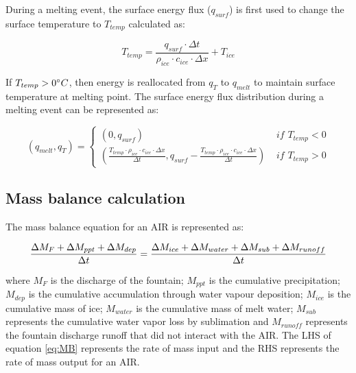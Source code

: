 \documentclass[utf8]{frontiersSCNS}
\begin{document}
During a melting event, the surface energy flux ($q_{surf}$) is first used to change the surface temperature to
$T_{temp}$ calculated as:

\begin{equation} T_{temp} =\frac{q_{surf} \cdot \Delta t}{\rho_{ice} \cdot c_{ice} \cdot \Delta x} + T_{ice} \end{equation}

If $T_{temp} > 0 \degree C$, then energy is reallocated from $q_{T}$ to $q_{melt}$ to maintain surface
temperature at melting point. The surface energy flux distribution during a melting event can be represented as:

\begin{equation}
	(q_{melt}, q_{T}) = \left\{ \begin{array}{ll}
		(0, q_{surf})                                                                                                                                                 & \textit{ if } T_{temp} < 0 \\
		(\frac{T_{temp} \cdot \rho_{ice} \cdot c_{ice} \cdot \Delta x}{\Delta t}, q_{surf}-\frac{T_{temp} \cdot \rho_{ice} \cdot c_{ice} \cdot \Delta x}{\Delta t}  ) & \textit{ if } T_{temp} > 0
	\end{array} \right.
\end{equation}


\subsection{Mass balance calculation}

The mass balance equation for an AIR is represented as:

\begin{equation}
	\frac{\Delta M_{F} + \Delta M_{ppt} + \Delta M_{dep}}{\Delta t} = \frac{\Delta M_{ice} +\Delta M_{water} +
		\Delta M_{sub} + \Delta M_{runoff}}{\Delta t}  \\
	\label{eq:MB}
\end{equation}

where $M_{F}$ is the discharge of the fountain; $M_{ppt}$ is the cumulative precipitation;  $M_{dep}$ is the cumulative
accumulation through water vapour deposition; $M_{ice}$ is the cumulative mass of ice; $M_{water}$ is the cumulative
mass of melt water; $M_{sub}$ represents the cumulative water vapor loss by sublimation and $M_{runoff}$ represents the
fountain discharge runoff that did not interact with the AIR. The LHS of equation \ref{eq:MB} represents the rate of
mass input and the RHS represents the rate of mass output for an AIR.
\end{document}
